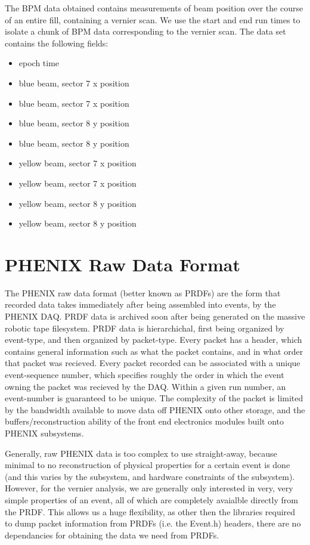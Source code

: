 The BPM data obtained contains measurements of beam position over the course of
an entire fill, containing a vernier scan. We use the start and end run times to
isolate a chunk of BPM data corresponding to the vernier scan. The data set
contains the following fields:
\begin{itemize}
\item epoch time
\item blue beam, sector 7 x position
\item blue beam, sector 7 x position
\item blue beam, sector 8 y position
\item blue beam, sector 8 y position
\item yellow beam, sector 7 x position
\item yellow beam, sector 7 x position
\item yellow beam, sector 8 y position
\item yellow beam, sector 8 y position
\end{itemize}




\section{PHENIX Raw Data Format} 

The PHENIX raw data format (better known as PRDFs) are the form that recorded
data takes immediately after being assembled into events, by the PHENIX DAQ.
PRDF data is archived soon after being generated on the massive robotic tape
filesystem. PRDF data is hierarchichal, first being organized by event-type, and
then organized by packet-type.  Every packet has a header, which contains
general information such as what the packet contains, and in what order that
packet was recieved. Every packet recorded can be associated with a unique
event-sequence number, which specifies roughly the order in which the event
owning the packet was recieved by the DAQ. Within a given run number, an
event-number is guaranteed to be unique. The complexity of the packet is limited
by the bandwidth available to move data off PHENIX onto other storage, and the
buffers/reconstruction ability of the front end electronics modules built onto
PHENIX subsystems.

Generally, raw PHENIX data is too complex to use straight-away, because minimal
to no reconstruction of physical properties for a certain event is done (and
this varies by the subsystem, and hardware constraints of the subsystem).
However, for the vernier analysis, we are generally only interested in very,
very simple properties of an event, all of which are completely avaialble
directly from the PRDF. This allows us a huge flexibility, as other then the
libraries required to dump packet information from PRDFs (i.e. the Event.h)
headers, there are no dependancies for obtaining the data we need from PRDFs.

